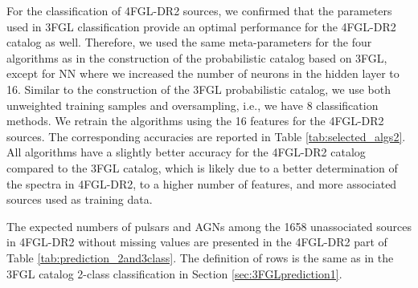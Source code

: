 For the classification of 4FGL-DR2 sources, we confirmed that the parameters used in 3FGL classification provide an optimal performance for the 4FGL-DR2 catalog as well.
Therefore, we used the same meta-parameters for the four algorithms as in the construction of the probabilistic catalog based on 3FGL, except for NN where we increased the number of neurons in the hidden layer to 16. Similar to the construction of the 3FGL probabilistic catalog, we use both unweighted training samples and oversampling, i.e., we have 8 classification methods.
We retrain the algorithms using the 16 features for the 4FGL-DR2 sources.
The corresponding accuracies are reported in Table \ref{tab:selected_algs2}.
All algorithms have a slightly better accuracy for the 4FGL-DR2 catalog compared to the 3FGL catalog, which is likely due to a better determination of the spectra in 4FGL-DR2, to a higher number of features, and more associated sources used as training data. 


\begin{table}[!h]
    \vspace{0.2cm}
    \caption{Testing accuracy of the 4 algorithms on 4FGL-DR2 associated data. ``\_O'' denotes training with oversampling.}
    \label{tab:selected_algs2}
\end{table}

The expected numbers of pulsars and AGNs among the 1658 unassociated sources in 4FGL-DR2 without missing values are
presented in the 4FGL-DR2 part of Table \ref{tab:prediction_2and3class}.
The definition of rows is the same as in the 3FGL catalog 2-class classification in Section \ref{sec:3FGLprediction1}.


